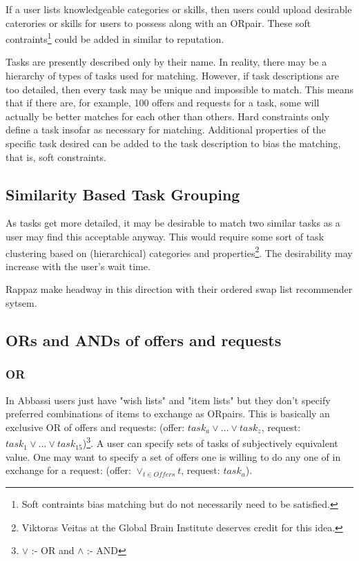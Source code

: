 \documentclass[main.tex]{subfiles}
\begin{document}
If a user lists knowledgeable categories or skills, then users could upload desirable caterories or skills for users to possess along with an ORpair. These soft contraints\footnote{Soft contraints bias matching but do not necessarily need to be satisfied.} could be added in similar to reputation.

Tasks are presently described only by their name. In reality, there may be a hierarchy of types of tasks used for matching. However, if task descriptions are too detailed, then every task may be unique and impossible to match. This means that if there are, for example, 100 offers and requests for a task, some will actually be better matches for each other than others. Hard constraints only define a task insofar as necessary for matching. Additional properties of the specific task desired can be added to the task description to bias the matching, that is, soft constraints.

\subsection{Similarity Based Task Grouping}
As tasks get more detailed, it may be desirable to match two similar tasks as a user may find this acceptable anyway. This would require some sort of task clustering based on (hierarchical) categories and properties\footnote{Viktoras Veitas at the Global Brain Institute deserves credit for this idea.}. The desirability may increase with the user's wait time.

Rappaz \cite{Rap1} make headway in this direction with their ordered swap list recommender sytsem.

\subsection{ORs and ANDs of offers and requests}
\subsubsection{OR}

In Abbassi \cite{Abb1} \cite{Abb2} users just have "wish lists" and "item lists" but they don't specify preferred combinations of items to exchange as ORpairs. This is basically an exclusive OR of offers and requests: (offer: $task_a \vee \dots \vee task_z$, request: $task_1 \vee \dots \vee task_15$)\footnote{$\vee$ :- OR and $\wedge$ :- AND}. A user can specify sets of tasks of subjectively equivalent value. One may want to specify a set of offers one is willing to do any one of in exchange for a request: (offer: $\vee_{t \in Offers} t$, request: $task_a$).
\end{document}
